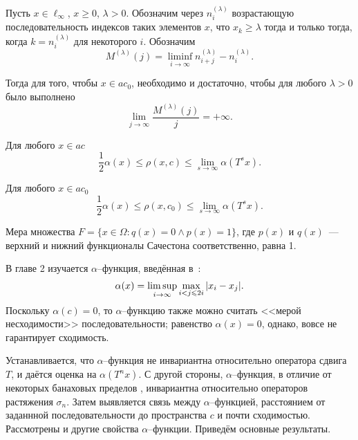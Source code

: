 	Пусть $x\in\ell_\infty$, $x \geq 0$, $\lambda>0$.
	Обозначим через $n^{(\lambda)}_i$ возрастающую последовательность
	индексов таких элементов $x$, что $x_k \geq \lambda$ тогда и только тогда,
	когда $k=n^{(\lambda)}_i$ для некоторого $i$.
	Обозначим
	\begin{equation}
		M^{(\lambda)}(j) = \liminf_{i\to\infty} n^{(\lambda)}_{i+j} - n^{(\lambda)}_i
		.
	\end{equation}


	Тогда для того, чтобы $x\in ac_0$, необходимо и достаточно, чтобы
	для любого $\lambda>0$ было выполнено
	\begin{equation}
		\lim_{j \to \infty} \frac{M^{(\lambda)}(j)}{j} = +\infty
		.
	\end{equation}

	Для любого $x\in ac$
	\begin{equation}
		\frac{1}{2} \alpha(x) \leq \rho(x,c)\leq \lim_{s\to\infty} \alpha(T^s x)
		.
	\end{equation}

	Для любого $x\in ac_0$
	\begin{equation}
		\frac{1}{2} \alpha(x) \leq \rho(x,c_0)\leq \lim_{s\to\infty} \alpha(T^s x)
		.
	\end{equation}

	Мера множества $F=\{x\in\Omega : q(x) = 0 \wedge p(x)= 1\}$,
	где $p(x)$ и $q(x)$~--- верхний и нижний функционалы Сачестона соответственно,
	равна 1.


В главе 2
изучается $\alpha$--функция, введённая в~\cite{our-vzms-2018}:
\begin{equation}
	\alpha(x) = \varlimsup_{i\to\infty} \max_{i<j\leqslant 2i} |x_i - x_j|
	.
\end{equation}
%
%
Поскольку $\alpha(c)=0$,
то $\alpha$--функцию также можно считать <<мерой несходимости>> последовательности;
равенство $\alpha(x) = 0$, однако, вовсе не гарантирует сходимость.

Устанавливается, что $\alpha$--функция не инвариантна относительно оператора сдвига $T$,
и даётся оценка на $\alpha(T^n x)$.
С другой стороны, $\alpha$--функция, в отличие от некоторых банаховых пределов
\cite{Semenov2010invariant,Semenov2011dan},
инвариантна относительно операторов растяжения $\sigma_n$.
Затем выявляется связь между $\alpha$--функцией, расстоянием от заданнной последовательности до пространства $c$
и почти сходимостью.
Рассмотрены и другие свойства $\alpha$--функции.
Приведём основные результаты.


